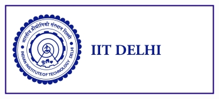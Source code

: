 \documentclass[final]{beamer}
\newlength{\sepwid}
\newlength{\onecolwid}
\begin{document}
\begin{frame}
\begin{columns}[t]
\begin{column}{\onecolwid}








\begin{center}
\includegraphics[width=0.7\linewidth]{img/iitd_logo.jpg}
\end{center}





\end{column} %

\begin{column}{\sepwid}\end{column} %

\end{columns} %

\end{frame} %
\end{document}

